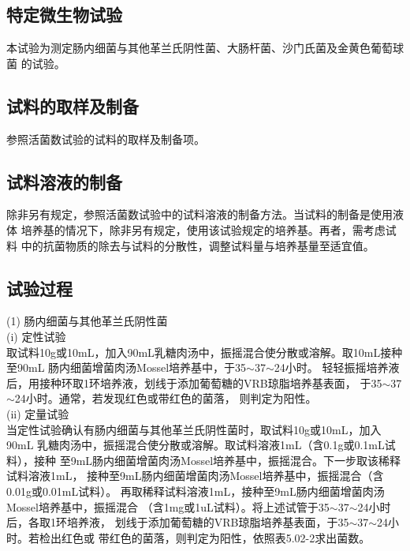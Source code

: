 \documentclass[11pt,a4paper]{article}
\newenvironment{SC}{%
  \CJKfamily{gbsn}%
  \CJKtilde
  \CJKnospace}{}
\begin{document}
\begin{CJK}{UTF8}{}
\begin{SC}
\section{特定微生物试验}
本试验为测定肠内细菌与其他革兰氏阴性菌、大肠杆菌、沙门氏菌及金黄色葡萄球菌
的试验。

\subsection*{试料的取样及制备}
参照活菌数试验的试料的取样及制备项。

\subsection*{试料溶液的制备}
除非另有规定，参照活菌数试验中的试料溶液的制备方法。当试料的制备是使用液体
培养基的情况下，除非另有规定，使用该试验规定的培养基。再者，需考虑试料
中的抗菌物质的除去与试料的分散性，调整试料量与培养基量至适宜值。

\subsection*{试验过程}
(1) 肠内细菌与其他革兰氏阴性菌\\

(i) 定性试验\\
取试料10g或10mL，加入90mL乳糖肉汤中，振摇混合使分散或溶解。取10mL接种至90mL
肠内细菌增菌肉汤Mossel培养基中，于35$\sim$37$\sim$24小时。
轻轻振摇培养液后，用接种环取1环培养液，划线于添加葡萄糖的VRB琼脂培养基表面，
于35$\sim$37$\sim$24小时。通常，若发现红色或带红色的菌落，
则判定为阳性。\\

(ii) 定量试验\\
当定性试验确认有肠内细菌与其他革兰氏阴性菌时，取试料10g或10mL，加入90mL
乳糖肉汤中，振摇混合使分散或溶解。取试料溶液1mL（含0.1g或0.1mL试料），接种
至9mL肠内细菌增菌肉汤Mossel培养基中，振摇混合。下一步取该稀释试料溶液1mL，
接种至9mL肠内细菌增菌肉汤Mossel培养基中，振摇混合（含0.01g或0.01mL试料）。
再取稀释试料溶液1mL，接种至9mL肠内细菌增菌肉汤Mossel培养基中，振摇混合
（含1mg或1uL试料）。将上述试管于35$\sim$37$\sim$24小时后，各取1环培养液，
划线于添加葡萄糖的VRB琼脂培养基表面，于35$\sim$37$\sim$24小时。若检出红色或
带红色的菌落，则判定为阳性，依照表5.02-2求出菌数。\\


\end{SC}
\end{CJK}
\end{document}
